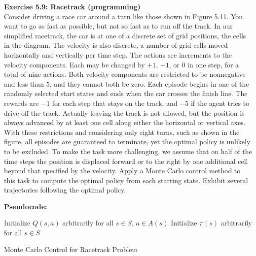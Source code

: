 \documentclass[addpoints]{exam}
\begin{document}
\begin{questions}
    \question
    \textbf{Exercise 5.9: Racetrack (programming)} \\ Consider driving a race car around a turn like those shown in Figure 5.11. You want to go as fast as possible, but not so fast as to run off the track. In our simplified racetrack, the car is at one of a discrete set of grid positions, the cells in the diagram. The velocity is also discrete, a number of grid cells moved horizontally and vertically per time step. The actions are increments to the velocity components. Each may be changed by \(+1\), \(-1\), or \(0\) in one step, for a total of nine actions. Both velocity components are restricted to be nonnegative and less than \(5\), and they cannot both be zero. Each episode begins in one of the randomly selected start states and ends when the car crosses the finish line. The rewards are \(-1\) for each step that stays on the track, and \(-5\) if the agent tries to drive off the track. Actually leaving the track is not allowed, but the position is always advanced by at least one cell along either the horizontal or vertical axes. With these restrictions and considering only right turns, such as shown in the figure, all episodes are guaranteed to terminate, yet the optimal policy is unlikely to be excluded. To make the task more challenging, we assume that on half of the time steps the position is displaced forward or to the right by one additional cell beyond that specified by the velocity. Apply a Monte Carlo control method to this task to compute the optimal policy from each starting state. Exhibit several trajectories following the optimal policy.
    \begin{solution}
        \textbf{Pseudocode:}

\begin{algorithm}[H]
    Initialize \( Q(s, a) \) arbitrarily for all \( s \in S \), \( a \in A(s) \)\;
    Initialize \( \pi(s) \) arbitrarily for all \( s \in S \)\;
    \caption{Monte Carlo Control for Racetrack Problem}
\end{algorithm}
    \end{solution}


\end{questions}
\end{document}
